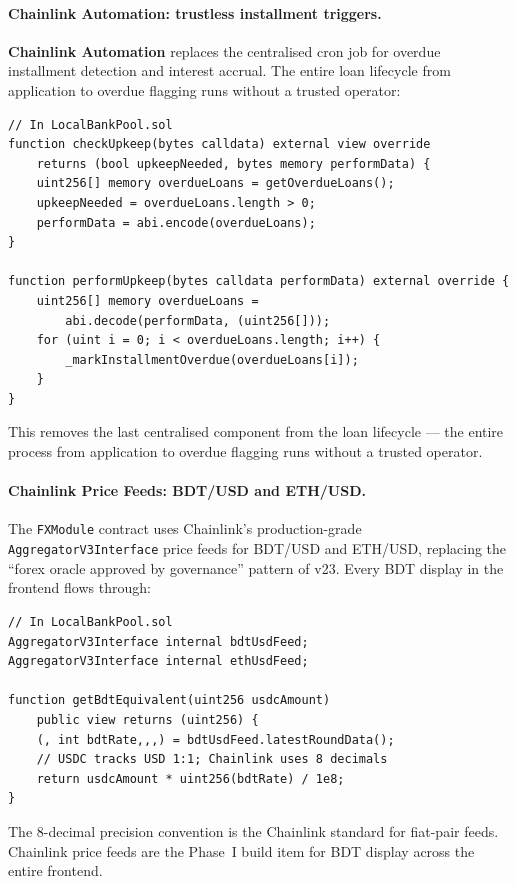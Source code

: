 \documentclass[12pt,a4paper]{report}
\begin{document}
\paragraph{Chainlink Automation: trustless installment triggers.}
\textbf{Chainlink Automation} replaces the centralised cron job for overdue installment detection and interest accrual. The entire loan lifecycle from application to overdue flagging runs without a trusted operator:

\begin{verbatim}
// In LocalBankPool.sol
function checkUpkeep(bytes calldata) external view override
    returns (bool upkeepNeeded, bytes memory performData) {
    uint256[] memory overdueLoans = getOverdueLoans();
    upkeepNeeded = overdueLoans.length > 0;
    performData = abi.encode(overdueLoans);
}

function performUpkeep(bytes calldata performData) external override {
    uint256[] memory overdueLoans =
        abi.decode(performData, (uint256[]));
    for (uint i = 0; i < overdueLoans.length; i++) {
        _markInstallmentOverdue(overdueLoans[i]);
    }
}
\end{verbatim}

This removes the last centralised component from the loan lifecycle --- the entire process from application to overdue flagging runs without a trusted operator.

\paragraph{Chainlink Price Feeds: BDT/USD and ETH/USD.}
The \texttt{FXModule} contract uses Chainlink's production-grade \texttt{AggregatorV3Interface} price feeds for BDT/USD and ETH/USD, replacing the ``forex oracle approved by governance'' pattern of v23. Every BDT display in the frontend flows through:

\begin{verbatim}
// In LocalBankPool.sol
AggregatorV3Interface internal bdtUsdFeed;
AggregatorV3Interface internal ethUsdFeed;

function getBdtEquivalent(uint256 usdcAmount)
    public view returns (uint256) {
    (, int bdtRate,,,) = bdtUsdFeed.latestRoundData();
    // USDC tracks USD 1:1; Chainlink uses 8 decimals
    return usdcAmount * uint256(bdtRate) / 1e8;
}
\end{verbatim}

The 8-decimal precision convention is the Chainlink standard for fiat-pair feeds. Chainlink price feeds are the Phase~I build item for BDT display across the entire frontend.
\end{document}
